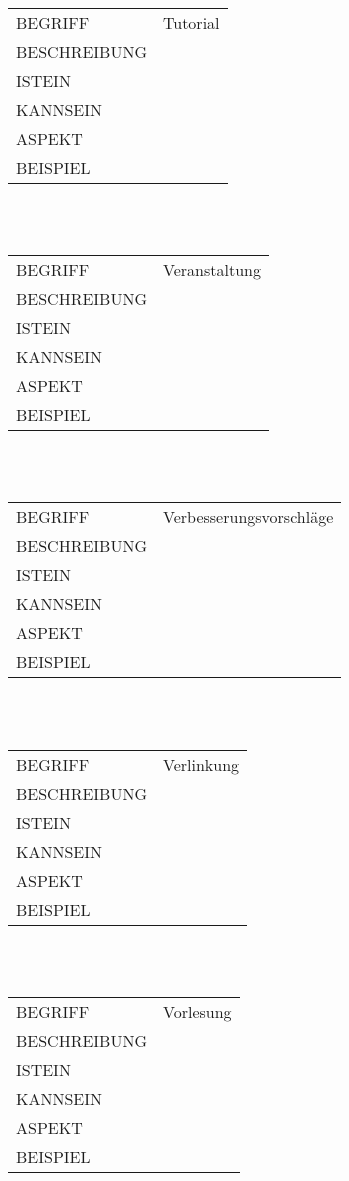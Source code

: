 \documentclass[12pt,a4paper]{article}
\begin{document}
\begin{tabular}{l p{10cm}}
BEGRIFF 	 & Tutorial \\ 
BESCHREIBUNG & \\ 
ISTEIN   	 & \\
KANNSEIN 	 & \\ 
ASPEKT   	 & \\
BEISPIEL 	 & \\
\hline
\end{tabular}\\\\  

\begin{tabular}{l p{10cm}}
BEGRIFF 	 & Veranstaltung \\ 
BESCHREIBUNG & \\ 
ISTEIN   	 & \\
KANNSEIN 	 & \\ 
ASPEKT   	 & \\
BEISPIEL 	 & \\
\hline
\end{tabular}\\\\  

\begin{tabular}{l p{10cm}}
BEGRIFF 	 & Verbesserungsvorschläge \\ 
BESCHREIBUNG & \\ 
ISTEIN   	 & \\
KANNSEIN 	 & \\ 
ASPEKT   	 & \\
BEISPIEL 	 & \\
\hline
\end{tabular}\\\\

\begin{tabular}{l p{10cm}} 
BEGRIFF 	 & Verlinkung \\ 
BESCHREIBUNG & \\ 
ISTEIN   	 & \\
KANNSEIN 	 & \\ 
ASPEKT   	 & \\
BEISPIEL 	 & \\
\hline
\end{tabular}\\\\ 

\begin{tabular}{l p{10cm}} 
BEGRIFF 	 & Vorlesung \\ 
BESCHREIBUNG & \\ 
ISTEIN   	 & \\
KANNSEIN 	 & \\ 
ASPEKT   	 & \\
BEISPIEL 	 & \\
\hline
\end{tabular}\\\\  
\end{document}

